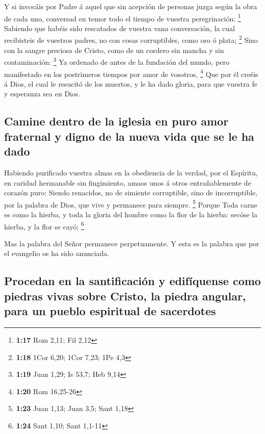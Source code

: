  Y si invocáis por Padre á aquel que sin acepción de
personas juzga según la obra de cada uno, conversad en temor todo el
tiempo de vuestra peregrinación: \footnote{\textbf{1:17} Rom 2,11; Fil
  2,12}  Sabiendo que habéis sido rescatados de vuestra
vana conversación, la cual recibisteis de vuestros padres, no con cosas
corruptibles, como oro ó plata; \footnote{\textbf{1:18} 1Cor 6,20; 1Cor
  7,23; 1Pe 4,3}  Sino con la sangre preciosa de Cristo,
como de un cordero sin mancha y sin contaminación: \footnote{\textbf{1:19}
  Juan 1,29; Is 53,7; Heb 9,14}  Ya ordenado de antes de la
fundación del mundo, pero manifestado en los postrimeros tiempos por
amor de vosotros, \footnote{\textbf{1:20} Rom 16,25-26} 
Que por él creéis á Dios, el cual le resucitó de los muertos, y le ha
dado gloria, para que vuestra fe y esperanza sea en Dios.

\hypertarget{camine-dentro-de-la-iglesia-en-puro-amor-fraternal-y-digno-de-la-nueva-vida-que-se-le-ha-dado}{%
\subsection{Camine dentro de la iglesia en puro amor fraternal y digno
de la nueva vida que se le ha
dado}\label{camine-dentro-de-la-iglesia-en-puro-amor-fraternal-y-digno-de-la-nueva-vida-que-se-le-ha-dado}}

 Habiendo purificado vuestra almas en la obediencia de la
verdad, por el Espíritu, en caridad hermanable sin fingimiento, amaos
unos á otros entrañablemente de corazón puro:  Siendo
renacidos, no de simiente corruptible, sino de incorruptible, por la
palabra de Dios, que vive y permanece para siempre. \footnote{\textbf{1:23}
  Juan 1,13; Juan 3,5; Sant 1,18}  Porque Toda carne es
como la hierba, y toda la gloria del hombre como la flor de la hierba:
secóse la hierba, y la flor se cayó; \footnote{\textbf{1:24} Sant 1,10;
  Sant 1,1-11}

 Mas la palabra del Señor permanece perpetuamente. Y esta
es la palabra que por el evangelio os ha sido anunciada.

\hypertarget{procedan-en-la-santificaciuxf3n-y-edifuxedquense-como-piedras-vivas-sobre-cristo-la-piedra-angular-para-un-pueblo-espiritual-de-sacerdotes}{%
\subsection{Procedan en la santificación y edifíquense como piedras
vivas sobre Cristo, la piedra angular, para un pueblo espiritual de
sacerdotes}\label{procedan-en-la-santificaciuxf3n-y-edifuxedquense-como-piedras-vivas-sobre-cristo-la-piedra-angular-para-un-pueblo-espiritual-de-sacerdotes}}

